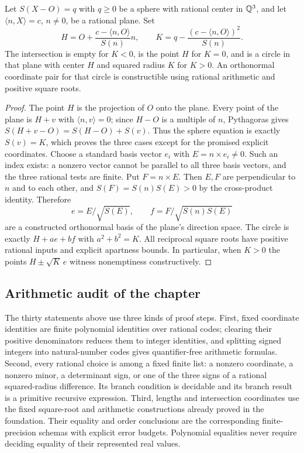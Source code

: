\begin{theorem}
\label{geo:sphere-plane}
Let $S(X-O)=q$ with $q\ge0$ be a sphere with rational center in $\mathbb Q^3$,
and let $\langle n,X\rangle=c$, $n\ne0$, be a rational plane. Set
\[
 H=O+\frac{c-\langle n,O\rangle}{S(n)}n,\qquad
 K=q-\frac{(c-\langle n,O\rangle)^2}{S(n)}.
\]
The intersection is empty for $K<0$, is the point $H$ for $K=0$, and is
a circle in that plane with center $H$ and squared radius $K$ for $K>0$.
An orthonormal coordinate pair for that circle is constructible using
rational arithmetic and positive square roots.
\end{theorem}
\begin{proof}
The point $H$ is the projection of $O$ onto the plane. Every point of the
plane is $H+v$ with $\langle n,v\rangle=0$; since $H-O$ is a multiple
of $n$, Pythagoras gives
$S(H+v-O)=S(H-O)+S(v)$. Thus the sphere equation is exactly $S(v)=K$,
which proves the three cases except for the promised explicit coordinates.
Choose a standard basis vector $e_i$ with $E=n\times e_i\ne0$.
Such an index exists: a nonzero vector cannot be parallel to all three
basis vectors, and the three rational tests are finite. Put $F=n\times E$.
Then $E,F$ are perpendicular to $n$ and to each other, and
$S(F)=S(n)S(E)>0$ by the cross-product identity. Therefore
\[
 e=E/\sqrt{S(E)},\qquad f=F/\sqrt{S(n)S(E)}
\]
are a constructed orthonormal basis of the plane's direction space.
The circle is exactly $H+ae+bf$ with $a^2+b^2=K$.
All reciprocal square roots have positive rational inputs and explicit
apartness bounds. In particular, when $K>0$ the points $H\pm\sqrt K\,e$
witness nonemptiness constructively.
\end{proof}

\subsection{Arithmetic audit of the chapter}

The thirty statements above use three kinds of proof steps. First, fixed
coordinate identities are finite polynomial identities over rational codes;
clearing their positive denominators reduces them to integer identities, and
splitting signed integers into natural-number codes gives quantifier-free
arithmetic formulas. Second, every rational choice is among a fixed finite
list: a nonzero coordinate, a nonzero minor, a determinant sign, or one of the
three signs of a rational squared-radius difference. Its branch condition is
decidable and its branch result is a primitive recursive expression. Third,
lengths and intersection coordinates use the fixed square-root and arithmetic
constructions already proved in the foundation. Their equality and order
conclusions are the corresponding finite-precision schemas with explicit
error budgets. Polynomial equalities never require deciding equality of their
represented real values.

